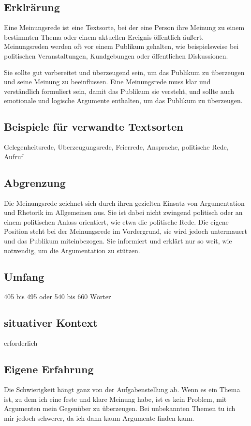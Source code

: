 \subsection{Erklrärung}

Eine Meinungsrede ist eine Textsorte, bei der eine Person ihre Meinung zu einem bestimmten Thema oder einem aktuellen Ereignis öffentlich äußert. Meinungsreden werden oft vor einem Publikum gehalten, wie beispielsweise bei politischen Veranstaltungen, Kundgebungen oder öffentlichen Diskussionen.

Sie sollte gut vorbereitet und überzeugend sein, um das Publikum zu überzeugen und seine Meinung zu beeinflussen. Eine Meinungsrede muss klar und verständlich formuliert sein, damit das Publikum sie versteht, und sollte auch emotionale und logische Argumente enthalten, um das Publikum zu überzeugen.



\subsection{Beispiele für verwandte Textsorten}Gelegenheitsrede, Überzeugungsrede, Feierrede, Ansprache, politische Rede, Aufruf
\subsection{Abgrenzung} Die Meinungsrede zeichnet sich durch ihren gezielten Einsatz von
Argumentation und Rhetorik im Allgemeinen aus. Sie ist dabei nicht
zwingend politisch oder an einem politischen Anlass orientiert, wie
etwa die politische Rede. Die eigene Position steht bei der Meinungsrede im Vordergrund, sie wird jedoch untermauert und das Publikum
miteinbezogen. Sie informiert und erklärt nur so weit, wie notwendig,
um die Argumentation zu stützen.
\subsection{Umfang} 405 bis 495 oder 540 bis 660 Wörter
\subsection{situativer Kontext} erforderlich
\subsection{Eigene Erfahrung} Die Schwierigkeit hängt ganz von der Aufgabenstellung ab. Wenn es ein Thema ist, zu dem ich eine feste und klare Meinung habe, ist es kein Problem, mit Argumenten mein Gegenüber zu überzeugen. Bei unbekannten Themen tu ich mir jedoch schwerer, da ich dann kaum Argumente finden kann.